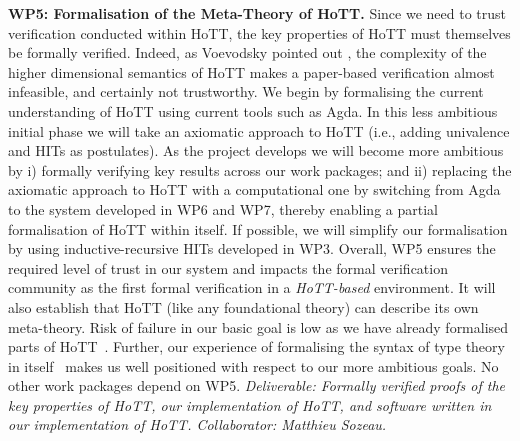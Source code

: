 \documentclass[a4paper,11pt]{article}
\begin{document}
{\bf WP5: Formalisation of the Meta-Theory of HoTT.}  Since we need to
trust verification conducted within HoTT, the key properties of HoTT
must themselves be formally verified. Indeed, as Voevodsky pointed out
\cite{voevodsky-ias14}, the complexity of the higher dimensional
semantics of HoTT makes a paper-based verification almost infeasible,
and certainly not trustworthy. We begin by formalising the current
understanding of HoTT using current tools such as Agda. In this less
ambitious initial phase we will take an axiomatic approach to HoTT
(i.e., adding univalence and HITs as postulates). As the project
develops we will become more ambitious by i) formally verifying key
results across our work packages; and ii) replacing the axiomatic
approach to HoTT with a computational one by switching from Agda to
the system developed in WP6 and WP7, thereby enabling a partial
formalisation of HoTT within itself. If possible, we will simplify our
formalisation by using inductive-recursive HITs developed in WP3.  Overall, WP5
ensures the required level of trust in our system and impacts
the formal verification community as the first formal
verification in a {\em HoTT-based} environment. It will also establish
that HoTT (like any foundational theory) can describe its own
meta-theory. Risk of failure in our basic goal is low as we have
already formalised parts of
HoTT~\cite{alti:csl12,AltenkirchLiRypacek14}. Further, our experience
of formalising the syntax of type theory in
itself~\cite{mcbride:outrageous,ghani:fibredIR,alti:catind2} makes us
well positioned with respect to our more ambitious goals. No other work packages
depend on WP5. {\em Deliverable: Formally verified proofs of
  the key properties of HoTT, our implementation of HoTT, and software
  written in our implementation of HoTT. Collaborator: Matthieu Sozeau.  }
\end{document}
